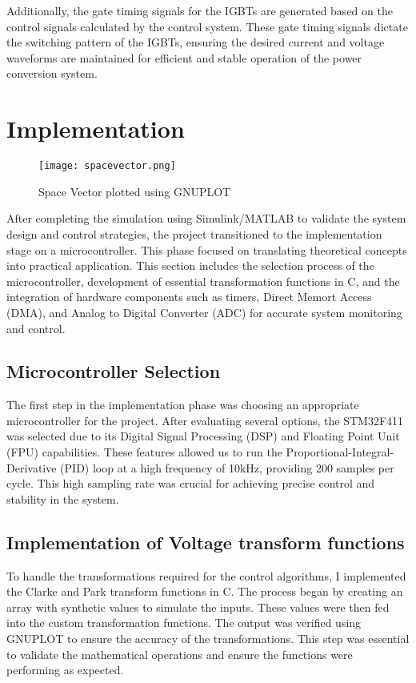 Additionally, the gate timing signals for the IGBTs are generated based on the
control signals calculated by the control system. These gate timing signals
dictate the switching pattern of the IGBTs, ensuring the desired current and
voltage waveforms are maintained for efficient and stable operation of the
power conversion system.

\section{Implementation}
\begin{figure}[h]
    \centering
    \texttt{[image: spacevector.png]}
    \caption{Space Vector plotted using GNUPLOT}
    \label{fig:Space Vector Generated using C code}
\end{figure}
After completing the simulation using Simulink/MATLAB to validate
the system design and control strategies, the project transitioned to the
implementation stage on a microcontroller. This phase focused on translating
theoretical concepts into practical application. This section includes the
selection process of the microcontroller, development of essential
transformation functions in C, and the integration of hardware components such
as timers, Direct Memort Access (DMA), and Analog to Digital Converter (ADC)
for accurate system monitoring and control.

\subsection{Microcontroller Selection}
The first step in the implementation phase was choosing an appropriate
microcontroller for the project. After evaluating several options, the
STM32F411 was selected due to its Digital Signal Processing (DSP) and Floating
Point Unit (FPU) capabilities. These features allowed us to run the
Proportional-Integral-Derivative (PID) loop at a high frequency of 10kHz,
providing 200 samples per cycle. This high sampling rate was crucial for
achieving precise control and stability in the system.

\subsection{Implementation of Voltage transform functions}
To handle the transformations required for the control algorithms, I
implemented the Clarke and Park transform functions in C. The process began by
creating an array with synthetic values to simulate the inputs. These values
were then fed into the custom transformation functions. The output was verified
using GNUPLOT to ensure the accuracy of the transformations. This step was
essential to validate the mathematical operations and ensure the functions were
performing as expected.

